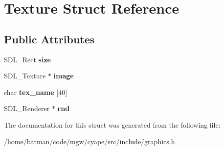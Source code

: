 \hypertarget{structTexture}{}\section{Texture Struct Reference}
\label{structTexture}
\subsection*{Public Attributes}
\begin{DoxyCompactItemize}
\item 
\hypertarget{structTexture_a50042c5b32424d63c29a7b41f90051e6}{}S\+D\+L\+\_\+\+Rect {\bfseries size}\label{structTexture_a50042c5b32424d63c29a7b41f90051e6}

\item 
\hypertarget{structTexture_a1b2f8a395d8b4b39166ef6ec66a92e49}{}S\+D\+L\+\_\+\+Texture $\ast$ {\bfseries image}\label{structTexture_a1b2f8a395d8b4b39166ef6ec66a92e49}

\item 
\hypertarget{structTexture_a81f88d3b6f9a2b44ed28325061bbbbce}{}char {\bfseries tex\+\_\+name} \mbox{[}40\mbox{]}\label{structTexture_a81f88d3b6f9a2b44ed28325061bbbbce}

\item 
\hypertarget{structTexture_a06d22237fa407cf63ada939da65ef4d2}{}S\+D\+L\+\_\+\+Renderer $\ast$ {\bfseries rnd}\label{structTexture_a06d22237fa407cf63ada939da65ef4d2}

\end{DoxyCompactItemize}


The documentation for this struct was generated from the following file\+:\begin{DoxyCompactItemize}
\item 
/home/batman/code/mgw/cyape/src/include/graphics.\+h\end{DoxyCompactItemize}
